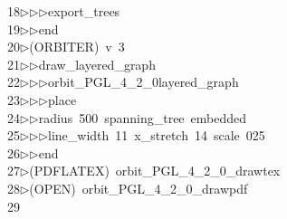 \begin{tabbing}
18\>$\triangleright$\>$\triangleright$\>$\triangleright$\>export\_trees\ \\[0pt]
19\>$\triangleright$\>$\triangleright$\>end\\[0pt]
20\>$\triangleright$\>(ORBITER)\ v\ 3\ \\[0pt]
21\>$\triangleright$\>$\triangleright$\>draw\_layered\_graph\ \\[0pt]
22\>$\triangleright$\>$\triangleright$\>$\triangleright$\>orbit\_PGL\_4\_2\_0layered\_graph\ \\[0pt]
23\>$\triangleright$\>$\triangleright$\>$\triangleright$\>place\ \\[0pt]
24\>$\triangleright$\>$\triangleright$\>radius\ 500\ spanning\_tree\ embedded\ \\[0pt]
25\>$\triangleright$\>$\triangleright$\>$\triangleright$\>line\_width\ 11\ x\_stretch\ 14\ scale\ 025\ \\[0pt]
26\>$\triangleright$\>$\triangleright$\>end\\[0pt]
27\>$\triangleright$\>(PDFLATEX)\ orbit\_PGL\_4\_2\_0\_drawtex\\[0pt]
28\>$\triangleright$\>(OPEN)\ orbit\_PGL\_4\_2\_0\_drawpdf\\[0pt]
29\>\end{tabbing}
